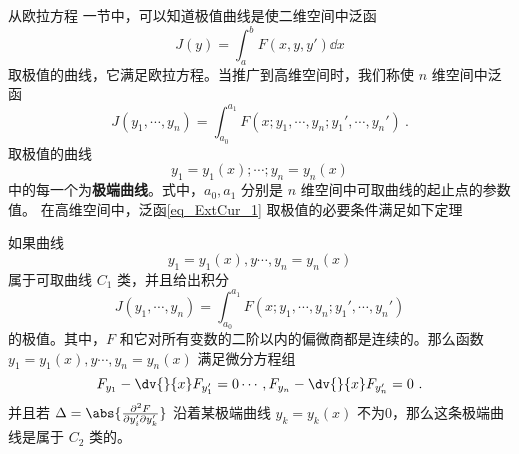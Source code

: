 

从欧拉方程 一节中，可以知道极值曲线是使二维空间中泛函 
\begin{equation}
J(y)=\int_a^b F(x,y,y')\dd x
\end{equation}
取极值的曲线，它满足欧拉方程。当推广到高维空间时，我们称使 $n$ 维空间中泛函 
\begin{equation}\label{eq_ExtCur_1}
J(y_1,\cdots, y_n)=\int_{a_0}^{a_1}F(x;y_1,\cdots,y_n;y_1',\cdots,y_n') ~.
\end{equation}
取极值的曲线 
\begin{equation}
y_1=y_1(x);\cdots;y_n=y_n(x)
\end{equation}
中的每一个为\textbf{极端曲线}。式中，$a_0,a_1$ 分别是 $n$ 维空间中可取曲线的起止点的参数值。 
在高维空间中，泛函\autoref{eq_ExtCur_1} 取极值的必要条件满足如下定理
\begin{theorem}{}
如果曲线 
\begin{equation}
y_1=y_1(x),y\cdots,y_n=y_n(x)
\end{equation}
属于可取曲线 $C_1$ 类，并且给出积分 
\begin{equation}
J(y_1,\cdots, y_n)=\int_{a_0}^{a_1}F(x;y_1,\cdots,y_n;y_1',\cdots,y_n') 
\end{equation}
 的极值。其中，$F$ 和它对所有变数的二阶以内的偏微商都是连续的。那么函数 $y_1=y_1(x),y\cdots,y_n=y_n(x)$ 满足微分方程组
\begin{equation}
F_{y_1}-\dv{}{x}F_{y_1'}=0\cdots, F_{y_n}-\dv{}{x}F_{y_n'}=0~.
\end{equation}
并且若 $\Delta=\abs{\frac{\partial^2 F}{\partial y_i'\partial y_k'}}$ 沿着某极端曲线 $y_k=y_k(x)$ 不为0，那么这条极端曲线是属于 $C_2$ 类的。
\end{theorem}
